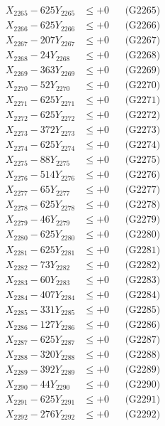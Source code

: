 \documentclass[a4paper,10pt]{article}
\begin{document}
{\begin{align}
X_{2265} - 625Y_{2265} &\leq +0 && \text{(G2265)} \\
X_{2266} - 625Y_{2266} &\leq +0 && \text{(G2266)} \\
X_{2267} - 207Y_{2267} &\leq +0 && \text{(G2267)} \\
X_{2268} - 24Y_{2268} &\leq +0 && \text{(G2268)} \\
X_{2269} - 363Y_{2269} &\leq +0 && \text{(G2269)} \\
X_{2270} - 52Y_{2270} &\leq +0 && \text{(G2270)} \\
\allowbreak
X_{2271} - 625Y_{2271} &\leq +0 && \text{(G2271)} \\
X_{2272} - 625Y_{2272} &\leq +0 && \text{(G2272)} \\
X_{2273} - 372Y_{2273} &\leq +0 && \text{(G2273)} \\
X_{2274} - 625Y_{2274} &\leq +0 && \text{(G2274)} \\
X_{2275} - 88Y_{2275} &\leq +0 && \text{(G2275)} \\
X_{2276} - 514Y_{2276} &\leq +0 && \text{(G2276)} \\
X_{2277} - 65Y_{2277} &\leq +0 && \text{(G2277)} \\
X_{2278} - 625Y_{2278} &\leq +0 && \text{(G2278)} \\
X_{2279} - 46Y_{2279} &\leq +0 && \text{(G2279)} \\
X_{2280} - 625Y_{2280} &\leq +0 && \text{(G2280)} \\
\allowbreak
X_{2281} - 625Y_{2281} &\leq +0 && \text{(G2281)} \\
X_{2282} - 73Y_{2282} &\leq +0 && \text{(G2282)} \\
X_{2283} - 60Y_{2283} &\leq +0 && \text{(G2283)} \\
X_{2284} - 407Y_{2284} &\leq +0 && \text{(G2284)} \\
X_{2285} - 331Y_{2285} &\leq +0 && \text{(G2285)} \\
X_{2286} - 127Y_{2286} &\leq +0 && \text{(G2286)} \\
X_{2287} - 625Y_{2287} &\leq +0 && \text{(G2287)} \\
X_{2288} - 320Y_{2288} &\leq +0 && \text{(G2288)} \\
X_{2289} - 392Y_{2289} &\leq +0 && \text{(G2289)} \\
X_{2290} - 44Y_{2290} &\leq +0 && \text{(G2290)} \\
\allowbreak
X_{2291} - 625Y_{2291} &\leq +0 && \text{(G2291)} \\
X_{2292} - 276Y_{2292} &\leq +0 && \text{(G2292)} \\

\end{align}}
\end{document}
